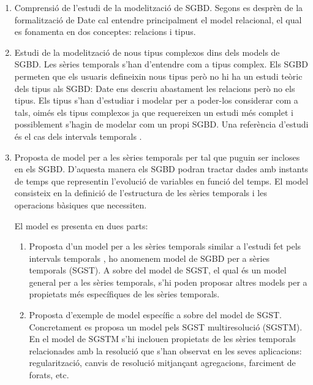 \begin{enumerate}

\item Comprensió de l'estudi de la modelització de SGBD. Segons es
  desprèn de la formalització de Date cal entendre principalment el
  model relacional, el qual es fonamenta en dos conceptes: relacions i
  tipus.

\item Estudi de la modelització de nous tipus complexos dins dels
  models de SGBD.  Les sèries temporals s'han d'entendre com a tipus
  complex.  Els SGBD permeten que els usuaris defineixin nous
  tipus \parencite{stonebraker86} però no hi ha un estudi teòric dels
  tipus als SGBD: Date ens descriu abastament les relacions però no
  els tipus. Els tipus s'han d'estudiar i modelar per a poder-los
  considerar com a tals, oimés els tipus complexos ja que requereixen
  un estudi més complet i possiblement s'hagin de modelar com un propi
  SGBD. Una referència d'estudi és el cas dels intervals
  temporals \parencite{date02:_tempor_data_relat_model}.



\item Proposta de model per a les sèries temporals per tal que puguin
  ser incloses en els SGBD. D'aquesta manera els SGBD podran tractar
  dades amb instants de temps que representin l'evolució de variables
  en funció del temps. El model consisteix en la definició de
  l'estructura de les sèries temporals i les operacions bàsiques que
  necessiten.

  El model es presenta en dues parts:

  \begin{enumerate}
  \item Proposta d'un model per a les sèries temporals similar a
    l'estudi fet pels intervals
    temporals \parencite{date02:_tempor_data_relat_model}, ho anomenem
    model de SGBD per a sèries temporals (SGST). A sobre del model de
    SGST, el qual és un model general per a les sèries temporals, s'hi
    poden proposar altres models per a propietats més específiques de
    les sèries temporals.

  \item Proposta d'exemple de model específic a sobre del model de
    SGST. Concretament es proposa un model pels SGST multiresolució
    (SGSTM).  En el model de SGSTM s'hi inclouen propietats de les
    sèries temporals relacionades amb la resolució que s'han observat
    en les seves aplicacions: regularització, canvis de resolució
    mitjançant agregacions, farciment de forats, etc.  
  \end{enumerate}


\end{enumerate}
